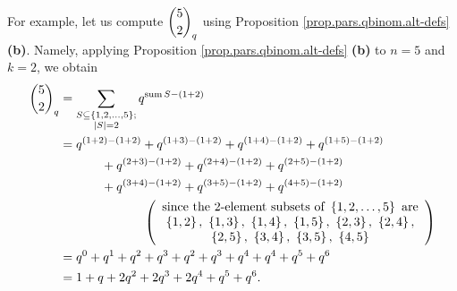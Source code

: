 \begin{example}
For example, let us compute $\dbinom{5}{2}_{q}$ using Proposition
\ref{prop.pars.qbinom.alt-defs} \textbf{(b)}. Namely, applying Proposition
\ref{prop.pars.qbinom.alt-defs} \textbf{(b)} to $n=5$ and $k=2$, we obtain%
\begin{align*}
\dbinom{5}{2}_{q}  &  =\sum_{\substack{S\subseteq\left\{  1,2,\ldots
,5\right\}  ;\\\left\vert S\right\vert =2}}q^{\operatorname*{sum}S-\left(
1+2\right)  }\\
&  =q^{\left(  1+2\right)  -\left(  1+2\right)  }+q^{\left(  1+3\right)
-\left(  1+2\right)  }+q^{\left(  1+4\right)  -\left(  1+2\right)
}+q^{\left(  1+5\right)  -\left(  1+2\right)  }\\
&  \ \ \ \ \ \ \ \ \ \ +q^{\left(  2+3\right)  -\left(  1+2\right)
}+q^{\left(  2+4\right)  -\left(  1+2\right)  }+q^{\left(  2+5\right)
-\left(  1+2\right)  }\\
&  \ \ \ \ \ \ \ \ \ \ +q^{\left(  3+4\right)  -\left(  1+2\right)
}+q^{\left(  3+5\right)  -\left(  1+2\right)  }+q^{\left(  4+5\right)
-\left(  1+2\right)  }\\
&  \ \ \ \ \ \ \ \ \ \ \ \ \ \ \ \ \ \ \ \ \left(
\begin{array}
[c]{c}%
\text{since the }2\text{-element subsets of }\left\{  1,2,\ldots,5\right\}
\text{ are}\\
\left\{  1,2\right\}  ,\ \left\{  1,3\right\}  ,\ \left\{  1,4\right\}
,\ \left\{  1,5\right\}  ,\ \left\{  2,3\right\}  ,\ \left\{  2,4\right\}  ,\\
\left\{  2,5\right\}  ,\ \left\{  3,4\right\}  ,\ \left\{  3,5\right\}
,\ \left\{  4,5\right\}
\end{array}
\right) \\
&  =q^{0}+q^{1}+q^{2}+q^{3}+q^{2}+q^{3}+q^{4}+q^{4}+q^{5}+q^{6}\\
&  =1+q+2q^{2}+2q^{3}+2q^{4}+q^{5}+q^{6}.
\end{align*}

\end{example}

